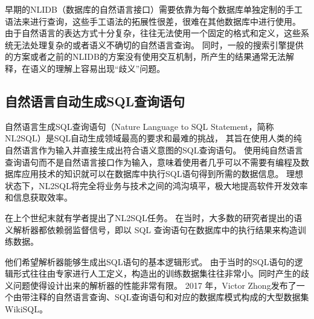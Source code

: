 早期的NLIDB（数据库的自然语言接口\cite{Androutsopoulos1995Natural}）需要依靠为每个数据库单独定制的手工语法来进行查询，这些手工语法的拓展性很差，很难在其他数据库中进行使用。
由于自然语言的表达方式十分复杂，往往无法使用一个固定的格式和定义，这些系统无法处理复杂的或者语义不确切的自然语言查询。
同时，一般的搜索引擎提供的方案或者之前的NLIDB的方案没有使用交互机制，所产生的结果通常无法解释，在语义的理解上容易出现“歧义”问题。
\subsection{自然语言自动生成SQL查询语句}
\label{intro:nl2sql}
自然语言生成SQL查询语句（Nature Language to SQL Statement，简称NL2SQL）是SQL自动生成领域最高的要求和最难的挑战，
其旨在使用人类的纯自然语言作为输入并直接生成出符合语义意图的SQL查询语句。
使用纯自然语言查询语句而不是自然语言接口作为输入，意味着使用者几乎可以不需要有编程及数据库应用技术的知识就可以在数据库中执行SQL语句得到所需的数据信息。
理想状态下，NL2SQL将完全将业务与技术之间的鸿沟填平，极大地提高软件开发效率和信息获取效率。

在上个世纪末就有学者提出了NL2SQL任务。
在当时，大多数的研究者提出的语义解析器\cite{goldman2017weakly}都依赖弱监督信号，即以 SQL 查询语句在数据库中的执行结果来构造训练数据。

他们希望解析器能够生成出SQL语句的基本逻辑形式。
由于当时的SQL语句的逻辑形式往往由专家进行人工定义，构造出的训练数据集往往非常小。同时产生的歧义问题使得设计出来的解析器的性能非常有限。
2017 年，Victor Zhong\cite{zhong2017seq2sql}发布了一个由带注释的自然语言查询、SQL查询语句和对应的数据库模式构成的大型数据集WikiSQL。

